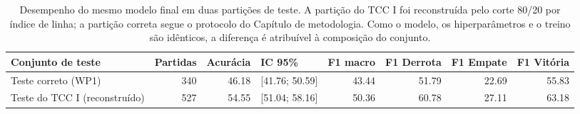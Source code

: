 \begin{table}[htbp]
\centering
\caption{Desempenho do mesmo modelo final em duas partições de teste. A partição do TCC I foi reconstruída pelo corte 80/20 por índice de linha; a partição correta segue o protocolo do Capítulo de metodologia. Como o modelo, os hiperparâmetros e o treino são idênticos, a diferença é atribuível à composição do conjunto.}
\label{tab:efeito-composicao}
\small
\begin{tabular}{lrrlrrrr}
\toprule
Conjunto de teste & Partidas & Acurácia & IC 95\% & F1 macro & F1 Derrota & F1 Empate & F1 Vitória \\
\midrule
Teste correto (WP1) & 340 & 46.18 & [41.76; 50.59] & 43.44 & 51.79 & 22.69 & 55.83 \\
Teste do TCC I (reconstruído) & 527 & 54.55 & [51.04; 58.16] & 50.36 & 60.78 & 27.11 & 63.18 \\
\bottomrule
\end{tabular}
\end{table}
